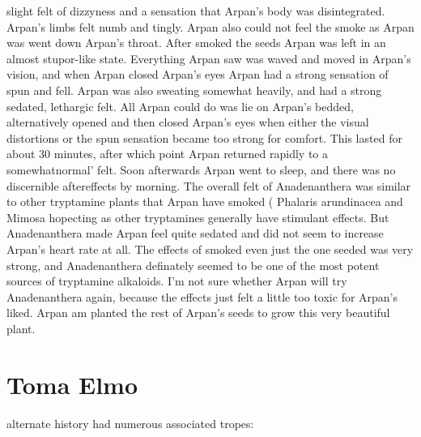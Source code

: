 \documentclass[12pt]{book}
\begin{document}
slight felt of dizzyness and a sensation that Arpan's body was disintegrated. Arpan's limbs felt numb and tingly. Arpan also could not feel the smoke as Arpan was went down Arpan's throat. After smoked the seeds Arpan was left in an almost stupor-like state. Everything Arpan saw was waved and moved in Arpan's vision, and when Arpan closed Arpan's eyes Arpan had a strong sensation of spun and fell. Arpan was also sweating somewhat heavily, and had a strong sedated, lethargic felt. All Arpan could do was lie on Arpan's bedded, alternatively opened and then closed Arpan's eyes when either the visual distortions or the spun sensation became too strong for comfort. This lasted for about 30 minutes, after which point Arpan returned rapidly to a somewhatnormal' felt. Soon afterwards Arpan went to sleep, and there was no discernible aftereffects by morning. The overall felt of Anadenanthera was similar to other tryptamine  plants that Arpan have smoked ( Phalaris arundinacea and Mimosa hopecting as other tryptamines generally have stimulant effects. But Anadenanthera made Arpan feel quite sedated and did not seem to increase Arpan's heart rate at all. The effects of smoked even just the one seeded was very strong, and Anadenanthera definately seemed to be one of the most potent sources of tryptamine alkaloids. I'm not sure whether Arpan will try Anadenanthera again, because the effects just felt a little too toxic for Arpan's liked. Arpan am planted the rest of Arpan's seeds to grow this very beautiful plant.



\chapter{Toma Elmo}

alternate history had numerous associated tropes:
\end{document}
